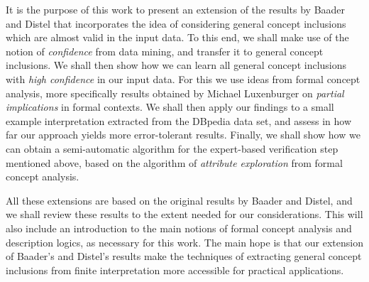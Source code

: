 It is the purpose of this work to present an extension of the results by Baader and Distel
that incorporates the idea of considering general concept inclusions which are almost
valid in the input data.  To this end, we shall make use of the notion of
\emph{confidence} from data mining, and transfer it to general concept inclusions.  We
shall then show how we can learn all general concept inclusions with \emph{high
  confidence} in our input data.  For this we use ideas from formal concept analysis, more
specifically results obtained by Michael Luxenburger on \emph{partial implications} in
formal contexts.  We shall then apply our findings to a small example interpretation
extracted from the DBpedia data set, and assess in how far our approach yields more
error-tolerant results.  Finally, we shall show how we can obtain a semi-automatic
algorithm for the expert-based verification step mentioned above, based on the algorithm
of \emph{attribute exploration} from formal concept analysis.

All these extensions are based on the original results by Baader and Distel, and we shall
review these results to the extent needed for our considerations.  This will also include
an introduction to the main notions of formal concept analysis and description logics, as
necessary for this work.  The main hope is that our extension of Baader's and Distel's
results make the techniques of extracting general concept inclusions from finite
interpretation more accessible for practical applications.


